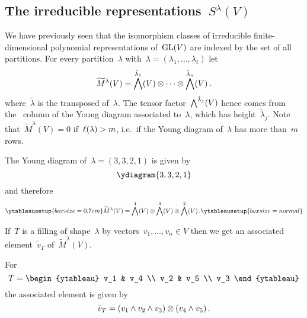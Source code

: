 \documentclass[a4paper,10pt]{scrartcl}
\begin{document}
\subsection{The irreducible representations~$S^\lambda(V)$}

We have previously seen that the isomorphism classes of irreducible finite-dimensional polynomial representations of~$\operatorname{GL}(V)$ are indexed by the set of all partitions.
For every partition~$\lambda$ with~$\lambda = (\lambda_1, \dotsc, \lambda_t)$ let
\[
  \widetilde{M}^\lambda(V)
  =
  \bigwedge^{\tilde{\lambda}_1}(V) \otimes \dotsb \otimes \bigwedge^{\tilde{\lambda}_n}(V) \,.
\]
where~$\tilde{\lambda}$ is the transposed of~$\lambda$.
The tensor factor~$\bigwedge^{\tilde{\lambda}_j}(V)$ hence comes from the~{} column of the Young diagram associated to~$\lambda$, which has height~$\tilde{\lambda}_j$.
Note that~$\widetilde{M}^\lambda(V) = 0$ if~$\operatorname{\ell}(\lambda) > m$, i.e.\ if the Young diagram of~$\lambda$ has more than~$m$ rows.

\begin{example}
  The Young diagram of~$\lambda = (3,3,2,1)$ is given by
  \[
    \ydiagram{3,3,2,1}
  \]
  and therefore
  \[
    \ytableausetup{boxsize=0.7em}
    \widetilde{M}^{\lambda}(V)
    =
    \Exterior^4(V) \tensor \Exterior^3(V) \tensor \Exterior^2(V) \,.
    \ytableausetup{boxsize=normal}
  \]
\end{example}

If~$T$ is a filling of shape~$\lambda$ by vectors~$v_1, \dotsc, v_n \in V$ then we get an associated element~$\tilde{v}_T$ of~$\widetilde{M}^{\lambda}(V)$.

\begin{example}
  For
  \[
    T
    =
    \begin{ytableau}
      v_1 & v_4 \\
      v_2 & v_5 \\
      v_3
    \end{ytableau}
  \]
  the associated element is given by
  \[
    \tilde{v}_T
    =
    (v_1 \wedge v_2 \wedge v_3) \otimes (v_4 \wedge v_5) \,.
  \]
\end{example}
\end{document}
